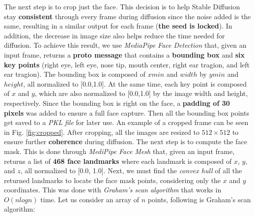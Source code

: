 \documentclass[preprint]{elsarticle}
\begin{document}
The next step is to crop just the face. 
This decision is to help Stable Diffusion stay \textbf{consistent} through every frame during diffusion since the noise added is the same, 
resulting in a similar output for each frame (\textbf{the seed is locked}). 
In addition, the decrease in image size also helps reduce the time needed for diffusion. 
To achieve this result, we use \emph{MediaPipe Face Detection} that, given an input frame, 
returns a \textbf{proto message} that contains a \textbf{bounding box} and \textbf{six key points} (right eye, left eye, nose tip, mouth center, right ear tragion, and left ear tragion). 
The bounding box is composed of $xmin$ and $width$ by $ymin$ and $height$, all normalized to [0.0,1.0]. 
At the same time, each key point is composed of $x$ and $y$, which are also normalized to [0.0,1.0] by the image width and height, respectively. 
Since the bounding box is right on the face, a \textbf{padding of 30 pixels} was added to ensure a full face capture.
Then all the bounding box points get saved to a \emph{PKL file} for later use. 
An example of a cropped frame can be seen in Fig. \ref{fig:cropped}.
After cropping, all the images are resized to $512 \times 512$ to ensure further \textbf{coherence} during diffusion. 
The next step is to compute the face mask. 
This is done through \emph{MediPipe Face Mesh} that, given an input frame, returns a list of \textbf{468 face landmarks} 
where each landmark is composed of $x$, $y$, and $z$, all normalized to  [0.0, 1.0]. 
Next, we must find the \emph{convex hull} of all the returned landmarks to locate the face mask points, considering only the $x$ and $y$ coordinates. 
This was done with \emph{Graham's scan algorithm} \cite{GRAHAM1972132} that works in $O(n log n)$ time. Let us consider an array of $n$ points, following is Graham's scan algorithm:
\end{document}
